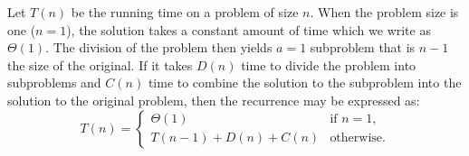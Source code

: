 Let $T(n)$ be the running time on a problem of size $n$. When the problem size is one ($n = 1$), the solution takes a constant amount of time which we write as $\Theta(1)$. The division of the problem then yields $a = 1$ subproblem that is $n - 1$ the size of the original. If it takes $D(n)$ time to divide the problem into subproblems and $C(n)$ time to combine the solution to the subproblem into the solution to the original problem, then the recurrence may be expressed as:
\begin{equation*}
	T(n) = \left\{
	       \begin{array}{ll}
		\Theta(1) & \text{if } n = 1, \\
		T(n - 1) + D(n) + C(n) & \text{otherwise}.
	\end{array} \right.
\end{equation*}
